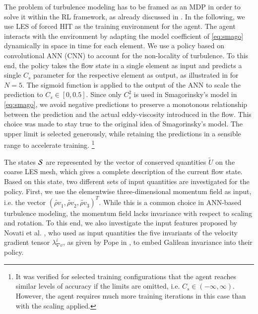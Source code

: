 The problem of turbulence modeling has to be framed as an MDP in order to solve it within the RL framework, as already discussed in .
In the following, we use LES of forced HIT as the training environment for the agent.
The agent interacts with the environment by adapting the model coefficient of \eqref{eq:smago} dynamically in space in time for each element. %
We use a policy based on convolutional ANN (CNN) to account for the non-locality of turbulence.
To this end, the policy takes the flow state in a single element as input and predicts a single $C_s$ parameter for the respective element as output, as illustrated in  for $N=5$.
The sigmoid function is applied to the output of the ANN to scale the prediction to $C_s\in[0,0.5]$.
Since only $C_s^2$ is used in Smagorinsky's model in \eqref{eq:smago}, we avoid negative predictions to preserve a monotonous relationship between the prediction and the actual eddy-viscosity introduced in the flow.
This choice was made to stay true to the original idea of Smagorinsky's model.
The upper limit is selected generously, while retaining the predictions in a sensible range to accelerate training.%
\footnote{It was verified for selected training configurations that the agent reaches similar levels of accuracy if the limits are omitted, i.e. $C_s\in(-\infty,\infty)$. However, the agent requires much more training iterations in this case than with the scaling applied.}

The states $\mathcal{S}$ are represented by the vector of conserved quantities $\tilde{U}$ on the coarse LES mesh, which gives a complete description of the current flow state.
Based on this state, two different sets of input quantities are investigated for the policy.
First, we use the elementwise three-dimensional momentum field as input, i.e. the vector $(\widetilde{\rho v}_1,\widetilde{\rho v}_2,\widetilde{\rho v}_3)^T$.
While this is a common choice in ANN-based turbulence modeling, the momentum field lacks invariance with respect to scaling and rotation.
To this end, we also investigate the input features proposed by Novati et al. \cite{novati2021automating}, who used as input quantities the five invariants of the velocity gradient tensor $\lambda_{\nabla v}^i$, as given by Pope in \cite{pope1975more}, to embed Galilean invariance into their policy.

